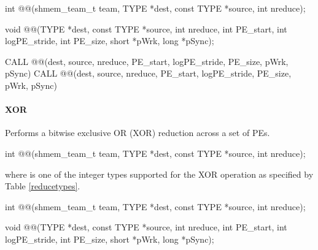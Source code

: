 \begin{apidefinition}
\begin{Csynopsis}
\end{Csynopsis}
{\color{Green}
\begin{CsynopsisCol}
int @@(shmem_team_t team, TYPE *dest, const TYPE *source, int nreduce);
\end{CsynopsisCol}
}
\begin{DeprecateBlock}
\begin{CsynopsisCol}
void @@(TYPE *dest, const TYPE *source, int nreduce, int PE_start, int logPE_stride, int PE_size, short *pWrk, long *pSync);
\end{CsynopsisCol}
\end{DeprecateBlock}

\begin{Fsynopsis}
CALL @@(dest, source, nreduce, PE_start, logPE_stride, PE_size, pWrk, pSync)
CALL @@(dest, source, nreduce, PE_start, logPE_stride, PE_size, pWrk, pSync)
\end{Fsynopsis}

\paragraph{XOR}
Performs a bitwise exclusive OR (XOR) reduction across a set of \acp{PE}.\newline

{\color{Green}
\begin{C11synopsis}
int @@(shmem_team_t team, TYPE *dest, const TYPE *source, int nreduce);
\end{C11synopsis}
where \TYPE{} is one of the integer types supported for the XOR operation as specified by Table \ref{reducetypes}.
}

\begin{Csynopsis}
\end{Csynopsis}
{\color{Green}
\begin{CsynopsisCol}
int @@(shmem_team_t team, TYPE *dest, const TYPE *source, int nreduce);
\end{CsynopsisCol}
}
\begin{DeprecateBlock}
\begin{CsynopsisCol}
void @@(TYPE *dest, const TYPE *source, int nreduce, int PE_start, int logPE_stride, int PE_size, short *pWrk, long *pSync);
\end{CsynopsisCol}
\end{DeprecateBlock}


\end{apidefinition}
